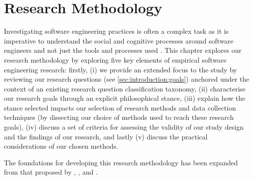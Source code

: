 \chapter{Research Methodology}
\label{ch:research-methodology}

\graphicspath{{mainmatter/research-methodology/figures/}}

\label{sec:research-methodology:preface}

Investigating software engineering practices is often a complex task as it is imperative to understand the social and cognitive processes around software engineers and not just the tools and processes used \citep{Easterbrook:2007ws}. This chapter explores our research methodology by exploring five key elements of empirical software engineering research: firstly, (i) we provide an extended focus to the study by reviewing our research questions (see \cref{sec:introduction:goals}) anchored under the context of an existing research question classification taxonomy, (ii) characterise our research goals through an explicit philosophical stance, (iii) explain how the stance selected impacts our selection of research methods and data collection techniques (by dissecting our choice of methods used to reach these research goals), (iv) discuss a set of criteria for assessing the validity of our study design and the findings of our research, and lastly (v) discuss the practical considerations of our chosen methods. 

The foundations for developing this research methodology has been expanded from that proposed by \citet{Easterbrook:2007ws}, \citet{Wohlin:2014jq}, \citet{Wohlin:2012bu} and \citet{Shaw:2003aa}.





%